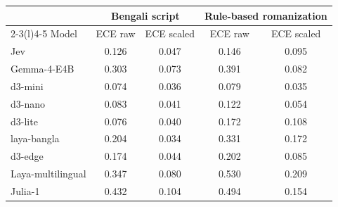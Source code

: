 \begin{tabular}{@{}lcccc@{}}\toprule
 & \multicolumn{2}{c}{Bengali script} & \multicolumn{2}{c}{Rule-based romanization} \\\cmidrule(lr){2-3}\cmidrule(l){4-5}
Model & ECE raw & ECE scaled & ECE raw & ECE scaled \\\midrule
Jev & 0.126 & 0.047 & 0.146 & 0.095 \\
Gemma-4-E4B & 0.303 & 0.073 & 0.391 & 0.082 \\
d3-mini & 0.074 & 0.036 & 0.079 & 0.035 \\
d3-nano & 0.083 & 0.041 & 0.122 & 0.054 \\
d3-lite & 0.076 & 0.040 & 0.172 & 0.108 \\
laya-bangla & 0.204 & 0.034 & 0.331 & 0.172 \\
d3-edge & 0.174 & 0.044 & 0.202 & 0.085 \\
Laya-multilingual & 0.347 & 0.080 & 0.530 & 0.209 \\
Julia-1 & 0.432 & 0.104 & 0.494 & 0.154 \\
\bottomrule\end{tabular}
